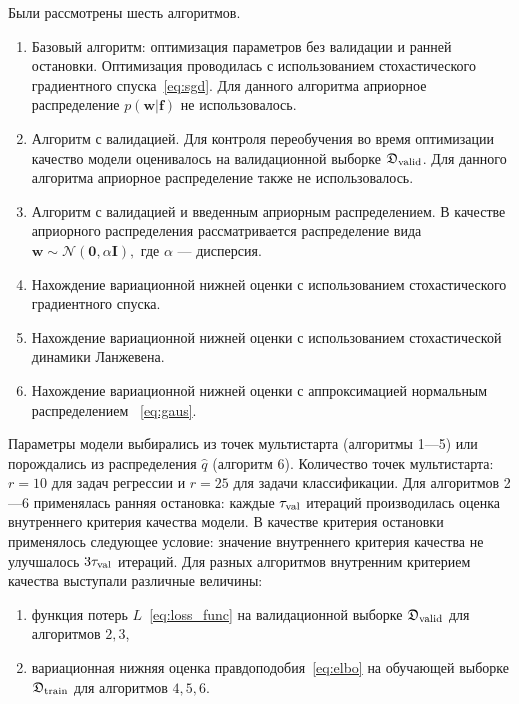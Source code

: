 Были рассмотрены шесть алгоритмов.
\begin{enumerate}%
\item Базовый алгоритм: оптимизация параметров без валидации и ранней остановки. Оптимизация проводилась с использованием стохастического градиентного спуска~\eqref{eq:sgd}. Для данного алгоритма априорное распределение $p(\mathbf{w}|\mathbf{f})$ не использовалось.
\item Алгоритм с валидацией. Для контроля переобучения во время оптимизации качество модели оценивалось на валидационной выборке $\mathfrak{D}_\textnormal{valid}$. Для данного алгоритма априорное распределение также не использовалось.
\item Алгоритм с валидацией и введенным априорным распределением. В качестве априорного распределения рассматривается распределение вида
$
	\mathbf{w} \sim \mathcal{N}(\mathbf{0}, \alpha \mathbf{I}), 
$
где $\alpha$ --- дисперсия.

\item Нахождение вариационной нижней оценки с использованием стохастического градиентного спуска.
\item Нахождение вариационной нижней оценки с использованием стохастической динамики Ланжевена.
\item Нахождение вариационной нижней оценки с аппроксимацией нормальным распределением ~\eqref{eq:gaus}.
\end{enumerate}




Параметры модели выбирались из точек мультистарта (алгоритмы 1---5) или порождались из распределения $\hat{q}$ (алгоритм 6). Количество точек мультистарта: $r=10$ {для задач регрессии и $r=25$ для задачи классификации}.
Для алгоритмов 2---6 применялась ранняя остановка: каждые $\tau_\textnormal{val}$ итераций производилась оценка внутреннего критерия качества модели. В качестве критерия остановки применялось следующее условие: значение внутреннего критерия качества не улучшалось $3\tau_\textnormal{val}$ итераций. Для разных алгоритмов внутренним критерием качества выступали различные величины:
\begin{enumerate}
\item функция потерь $L$~\eqref{eq:loss_func} на валидационной выборке $\mathfrak{D}_\textnormal{valid}$ для алгоритмов $2,3$,
\item вариационная нижняя оценка правдоподобия~\eqref{eq:elbo} на обучающей выборке $\mathfrak{D}_\textnormal{train}$ для алгоритмов $4,5,6$.
\end{enumerate}

